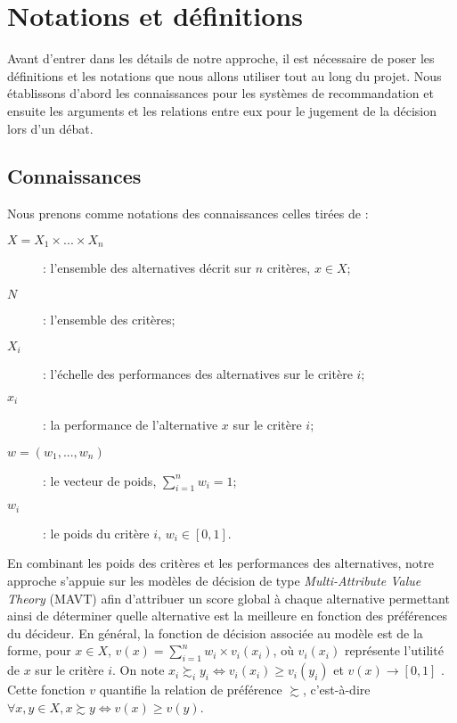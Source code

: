 \documentclass[a4paper, 11pt]{article}
\begin{document}
\section{Notations et définitions}

Avant d'entrer dans les détails de notre approche, il est nécessaire de poser les définitions et les notations que nous allons utiliser tout au long du projet. Nous établissons d'abord les connaissances pour les systèmes de recommandation et ensuite les arguments et les relations entre eux pour le jugement de la décision lors d'un débat.

\newpage

\subsection{Connaissances}

Nous prenons comme notations des connaissances celles tirées de \textcolor{blue}{\citep{LABREUCHE20111410}} :\\

\begin{description}

\item [$X = X_1 \times ... \times X_n$] : l'ensemble des alternatives décrit sur $n$ critères, $x \in X$;
\item [$N$] : l'ensemble des critères;
\item [$X_i$] : l'échelle des performances des alternatives sur le critère $i$;
\item [$x_i$] : la performance de l'alternative $x$ sur le critère $i$;
\item [$w=(w_1,...,w_n)$] : le vecteur de poids, $\sum_{i=1}^{n} w_i = 1$;
\item [$w_i$] : le poids du critère $i$, $w_i \in [0,1]$.\\
\end{description}

En combinant les poids des critères et les performances des alternatives, notre approche s'appuie sur les modèles de décision de type \textit{Multi-Attribute Value Theory} (MAVT) \textcolor{blue}{\citep{KEENEY}} afin d'attribuer un score global à chaque alternative permettant ainsi de déterminer quelle alternative est la meilleure en fonction des préférences du décideur. En général, la fonction de décision associée au modèle est de la forme, pour $x \in X$, $v(x) = \sum_{i=1}^{n} w_i \times v_i(x_i)$, où $v_i(x_i)$ représente l'utilité de $x$ sur le critère $i$. On note $ x_i \succsim_i y_i \Leftrightarrow v_i(x_i) \geq v_i(y_i)$ et $v(x) \rightarrow [0,1]$ . Cette fonction $v$ quantifie la relation de préférence $\succsim$, c'est-à-dire $\forall x,y \in X, x \succsim y \Leftrightarrow v(x) \geq v(y)$.\\
\end{document}
